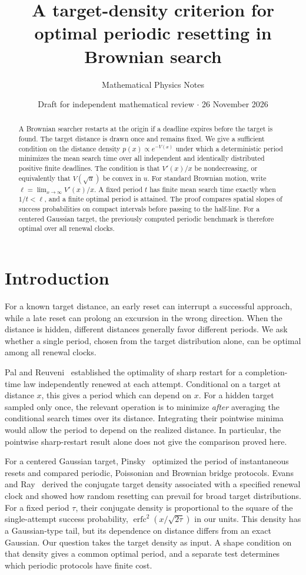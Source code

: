 \documentclass[11pt]{article}
\title{A target-density criterion for optimal periodic resetting in Brownian search}
\author{Mathematical Physics Notes}
\date{Draft for independent mathematical review \(\cdot\) 26 November 2026}
\newcommand{\erfc}{\operatorname{erfc}}
\begin{document}
\maketitle
\begin{abstract}
A Brownian searcher restarts at the origin if a deadline expires before the
target is found. The target distance is drawn once and remains fixed. We give a sufficient condition on
the distance density $p(x)\propto e^{-V(x)}$ under which a deterministic
period minimizes the mean search time over all independent and identically
distributed positive finite deadlines. The condition is that $V'(x)/x$ be
nondecreasing, or equivalently that $V(\sqrt{u})$ be convex in $u$.
For standard Brownian motion, write $\ell=\lim_{x\to\infty}V'(x)/x$.
A fixed period $t$ has finite mean search time exactly when $1/t<\ell$,
and a finite optimal period is attained. The proof compares spatial slopes
of success probabilities on compact intervals before passing to the
half-line. For a centered Gaussian target, the previously computed
periodic benchmark is therefore optimal over all renewal clocks.
\end{abstract}

\section{Introduction}
For a known target distance, an early reset can interrupt a successful
approach, while a late reset can prolong an excursion in the wrong
direction. When the distance is hidden, different distances generally
favor different periods. We ask whether a single period, chosen from the
target distribution alone, can be optimal among all renewal clocks.

Pal and Reuveni~\cite{pal} established the optimality of sharp restart for
a completion-time law independently renewed at each attempt. Conditional
on a target at distance $x$, this gives a period which can depend on $x$.
For a hidden target sampled only once, the relevant operation is to
minimize \emph{after} averaging the conditional search times over its
distance. Integrating their pointwise minima would allow the period to
depend on the realized distance. In particular, the pointwise
sharp-restart result alone does not give the comparison proved here.

For a centered Gaussian target, Pinsky~\cite[Theorem~3]{pinsky} optimized
the period of instantaneous resets and compared periodic, Poissonian and
Brownian bridge protocols. Evans and Ray~\cite{evans} derived the conjugate
target density associated with a specified renewal clock and showed how
random resetting can prevail for broad target distributions. For a fixed
period $\tau$, their conjugate density is proportional to the square of
the single-attempt success probability, $\erfc^2(x/\sqrt{2\tau})$ in
our units. This density has a Gaussian-type tail, but its dependence on
distance differs from an exact Gaussian. Our question takes the target
density as input. A shape condition on that density gives a common optimal
period, and a separate test determines which periodic protocols have finite cost.
\end{document}
